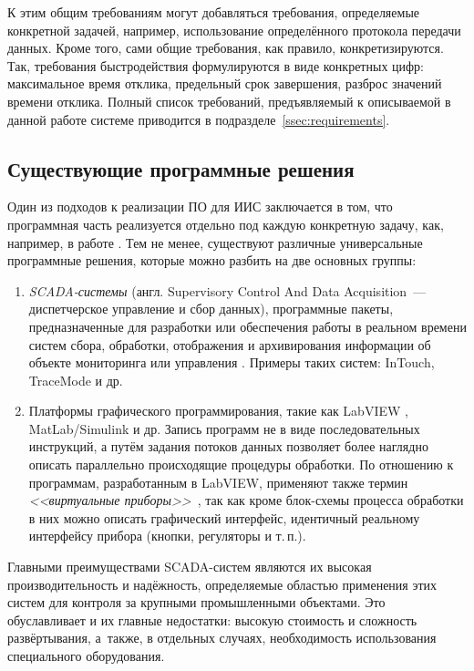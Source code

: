 \documentclass[a4paper, 14pt, titlepage]{extarticle}
\newcommand{\eng}[1]{\foreignlanguage{english}{#1}}
\newcommand{\term}[1]{\emph{#1}}
\begin{document}
  К этим общим требованиям могут добавляться требования, определяемые конкретной задачей, например,
  использование определённого протокола передачи данных. Кроме того, сами общие требования, как
  правило, конкретизируются. Так, требования быстродействия формулируются в виде конкретных цифр:
  максимальное время отклика, предельный срок завершения, разброс значений времени отклика.
  Полный список требований, предъявляемый к описываемой в данной работе системе приводится в
  подразделе~\ref{ssec:requirements}.

  \subsection{Существующие программные решения}\label{ssec:existing}

  Один из подходов к реализации ПО для ИИС заключается в том, что программная часть реализуется отдельно под
  каждую конкретную задачу, как, например, в работе \cite{bak-autometry}.
  Тем не менее, существуют различные универсальные программные решения, которые можно разбить на две
  основных группы:
  \begin{enumerate}
    \item \term{SCADA-системы} (англ. \eng{Supervisory Control And Data Acquisition}~--- диспетчерское управление и
      сбор данных), программные пакеты, предназначенные для разработки или обеспечения работы в
      реальном времени систем сбора, обработки, отображения и архивирования информации об объекте
      мониторинга или управления \cite{boyer-scada}.
      Примеры таких систем: InTouch, TraceMode и др.
    \item Платформы графического программирования, такие как LabVIEW \cite{lavrov-labview}, MatLab/Simulink и др.
      Запись программ не в виде последовательных инструкций, а путём задания потоков
      данных позволяет более наглядно описать параллельно происходящие процедуры обработки.
      По отношению к программам, разработанным в LabVIEW, применяют также термин \term{<<виртуальные приборы>>}~\cite[с.~209]{rannev-iis},
      так как кроме блок-схемы процесса обработки в них можно описать графический интерфейс,
      идентичный реальному интерфейсу прибора (кнопки, регуляторы и т.\,п.).
  \end{enumerate}

  Главными преимуществами SCADA-систем являются их высокая производительность и надёжность,
  определяемые областью применения этих систем для контроля за крупными промышленными объектами.
  Это обуславливает и их главные недостатки: высокую стоимость и сложность развёртывания, а~также, в отдельных
  случаях, необходимость использования специального оборудования.
\end{document}
